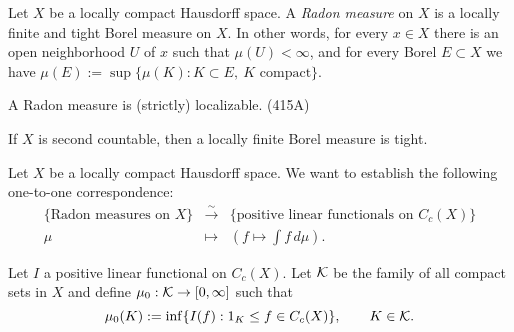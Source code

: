 \documentclass{../../large}
\begin{document}
\begin{prb}
Let $X$ be a locally compact Hausdorff space.
A \emph{Radon measure} on $X$ is a locally finite and tight Borel measure on $X$.
In other words, for every $x\in X$ there is an open neighborhood $U$ of $x$ such that $\mu(U)<\infty$, and for every Borel $E\subset X$ we have $\mu(E):=\sup\{\mu(K):K\subset E,\ K\text{ compact}\}$.

\begin{parts}
\item A Radon measure is (strictly) localizable. (415A)
\item If $X$ is second countable, then a locally finite Borel measure is tight.
\item
\end{parts}
\end{prb}

\begin{prb}
Let $X$ be a locally compact Hausdorff space.
We want to establish the following one-to-one correspondence:
\[\begin{array}{ccc}
\{\text{Radon measures on $X$}\} & \xrightarrow{\sim} & \{\text{positive linear functionals on $C_c(X)$}\}\\
\mu & \mapsto & (f\mapsto\int f\,d\mu).
\end{array}\]
\end{prb}
\begin{pf}
Let $I$ a positive linear functional on $C_c(X)$.
Let $\mathcal{K}$ be the family of all compact sets in $X$ and define $\mu_0:\mathcal{K}\to[0,\infty]$ such that
\[\mu_0(K):=\inf\{I(f):1_K\le f\in C_c(X)\},\qquad K\in\mathcal{K}.\]
\end{pf}
\end{document}
